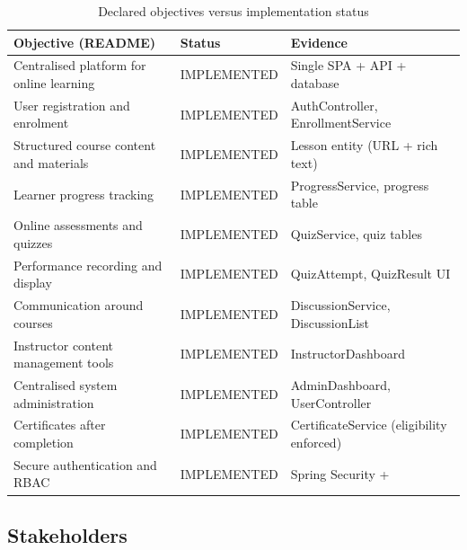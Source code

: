 \begin{table}[H]
\centering
\caption{Declared objectives versus implementation status}
\label{tab:brd-objectives}
\begin{tabular}{@{}L{7.6cm}C{3.0cm}L{3.0cm}@{}}
\toprule
\textbf{Objective (README)} & \textbf{Status} & \textbf{Evidence} \\
\midrule
Centralised platform for online learning & IMPLEMENTED & Single SPA + API + database \\
User registration and enrolment & IMPLEMENTED & AuthController, EnrollmentService \\
Structured course content and materials & IMPLEMENTED & Lesson entity (URL + rich text) \\
Learner progress tracking & IMPLEMENTED & ProgressService, progress table \\
Online assessments and quizzes & IMPLEMENTED & QuizService, quiz tables \\
Performance recording and display & IMPLEMENTED & QuizAttempt, QuizResult UI \\
Communication around courses & IMPLEMENTED & DiscussionService, DiscussionList \\
Instructor content management tools & IMPLEMENTED & InstructorDashboard \\
Centralised system administration & IMPLEMENTED & AdminDashboard, UserController \\
Certificates after completion & IMPLEMENTED & CertificateService (eligibility enforced) \\
Secure authentication and RBAC & IMPLEMENTED & Spring Security +  \\
\bottomrule
\end{tabular}
\end{table}

\subsection{Stakeholders}

